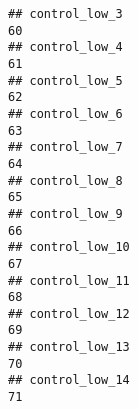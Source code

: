 \documentclass[
]{article}
\begin{document}
\begin{verbatim}
## control_low_3                                                                                                                                                                                                                60
## control_low_4                                                                                                                                                                                                                61
## control_low_5                                                                                                                                                                                                                62
## control_low_6                                                                                                                                                                                                                63
## control_low_7                                                                                                                                                                                                                64
## control_low_8                                                                                                                                                                                                                65
## control_low_9                                                                                                                                                                                                                66
## control_low_10                                                                                                                                                                                                               67
## control_low_11                                                                                                                                                                                                               68
## control_low_12                                                                                                                                                                                                               69
## control_low_13                                                                                                                                                                                                               70
## control_low_14                                                                                                                                                                                                               71

\end{verbatim}
\end{document}
